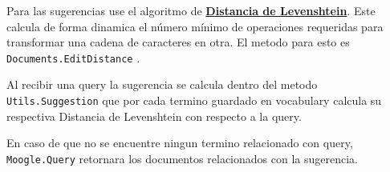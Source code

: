 \documentclass[10pt,a4paper]{report}
\begin{document}
\begin{flushleft}
\begin{flushleft}
    Para las sugerencias use el algoritmo de \textbf{\href{https://es.wikipedia.org/wiki/Distancia_de_Levenshtein}{Distancia de Levenshtein}}. Este calcula de forma dinamica el número mínimo de operaciones requeridas para transformar una cadena de caracteres en otra. El metodo para esto es \texttt{Documents.EditDistance} .

    Al recibir una query la sugerencia se calcula dentro del metodo \texttt{Utils.Suggestion} que por cada termino guardado en vocabulary calcula su respectiva Distancia de Levenshtein con respecto a la query.

    En caso de que no se encuentre ningun termino relacionado con query, \texttt{Moogle.Query} retornara los documentos relacionados con la sugerencia.

    \end{flushleft}

\end{flushleft}
\end{document}
